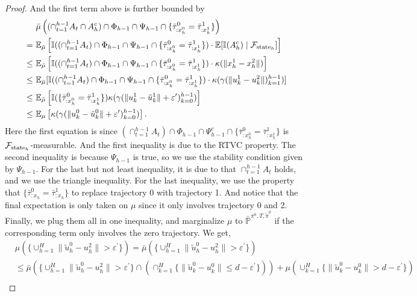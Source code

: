 \documentclass{article}
\begin{document}
\begin{proof}
    And the first term above is further bounded by
    \begin{align*}
        &~ \bar \mu\left((\cap_{t=1}^{h-1}A_t\cap A_h^c)\cap \Phi_{h-1}\cap \Psi_{h-1}\cap\{\bar \tau^0_{:x_h^0}=\bar \tau^1_{:x_h^1}\}\right)\\
        = &~ \mathbb E_{\bar \mu}\left[\mathbb I((\cap_{t=1}^{h-1}A_t) \cap \Phi_{h-1} \cap \Psi_{h-1}\cap\{\bar \tau^0_{:x_h^0}=\bar \tau^1_{:x_h^1}\})\cdot \mathbb E[\mathbb I(A_h^c)\mid\mathcal F_{\textnormal{state}_h}]\right]\\
        \leq &~ \mathbb E_{\bar \mu}\left[\mathbb I((\cap_{t=1}^{h-1}A_t) \cap \Phi_{h-1} \cap \Psi_{h-1}\cap\{\bar \tau^0_{:x_h^0}=\bar \tau^1_{:x_h^1}\})\cdot \kappa(\|x_h^1-x_h^2\|)\right]\\
        \leq &~ \mathbb E_{\bar \mu}[\mathbb I((\cap_{t=1}^{h-1}A_t) \cap \Phi_{h-1} \cap \Psi_{h-1}\cap\{\bar \tau^0_{:x_h^0}=\bar \tau^1_{:x_h^1}\}) \cdot \kappa(\gamma(\|u^1_k-u^2_k\|)_{k=1}^{h-1})]\\
        \leq &~ \mathbb E_{\bar \mu}\left[\mathbb I(\{\bar \tau^0_{:x_h^0}=\bar \tau^1_{:x_h^1}\})\kappa(\gamma(\|u_k^1-\tilde u_k^1\| + \varepsilon^\prime)_{k=0}^{h-1})\right]\\
        \leq &~ \mathbb E_\mu\left[\mathbb\kappa(\gamma(\|u_k^0-\tilde u_k^0\| + \varepsilon^\prime)_{k=0}^{h-1})\right].
    \end{align*}
    Here the first equation is since $(\cap_{t=1}^{h-1}A_t) \cap \Phi_{h-1} \cap \Psi_{h-1}^c\cap\{\bar \tau^0_{:x_h^0}=\bar \tau^1_{:x_h^1}\}$ is $\mathcal F_{\textnormal{state}_h}$-measurable. And the first inequality is due to the RTVC property. The second inequality is because $\Psi_{h-1}$ is true, so we use the stability condition given by $\Psi_{h-1}$. For the last but not least inequality, it is due to that $\mathop{\cap}_{t=1}^{h-1}A_t$ holds, and we use the triangle inequality. For the last inequality, we use the property that $\{\bar \tau_{:x_h}^0=\bar \tau_{:x_h}^1\}$ to replace trajectory 0 with trajectory 1. And notice that the final expectation is only taken on $\mu$ since it only involves trajectory 0 and 2.
    Finally, we plug them all in one inequality, and marginalize $\mu$ to $\bar {\mathbb P}^{\pi^0, T, \tilde \pi^0}$ if the corresponding term only involves the zero trajectory. We get,
    \begin{align*}
        &\mu\left(\{\cup_{h=1}^H \|\tilde u_h^0-u_h^2\|>\varepsilon^\prime\}\right)=\bar \mu\left(\{\cup_{h=1}^H \|\tilde u_h^0-u_h^2\|>\varepsilon^\prime\}\right)\\&\leq \bar \mu\left(\{\cup_{h=1}^H \|\tilde u_h^0-u_h^2\|>\varepsilon^\prime\}\cap (\mathop{\cap}_{k=1}^H \{\|\tilde u_k^0-u_k^0\| \leq d-\varepsilon^\prime\}) \right)+\mu\left(\cup_{k=1}^H\{\|\tilde u_k^0-u_k^0\|>d-\varepsilon^\prime\}\right)\\

\end{align*}
\end{proof}
\end{document}
